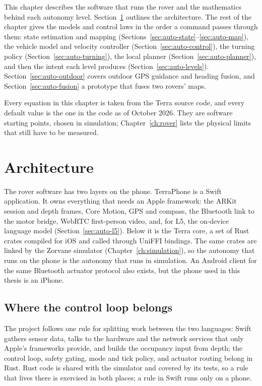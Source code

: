 This chapter describes the software that runs the rover and the mathematics behind each autonomy level.
Section~\ref{sec:arch} outlines the architecture.
The rest of the chapter gives the models and control laws in the order a command passes through them: state estimation and mapping (Sections~\ref{sec:auto-state}--\ref{sec:auto-map}), the vehicle model and velocity controller (Section~\ref{sec:auto-control}), the turning policy (Section~\ref{sec:auto-turning}), the local planner (Section~\ref{sec:auto-planner}), and then the intent each level produces (Section~\ref{sec:auto-levels}).
Section~\ref{sec:auto-outdoor} covers outdoor GPS guidance and heading fusion, and Section~\ref{sec:auto-fusion} a prototype that fuses two rovers' maps.

Every equation in this chapter is taken from the Terra source code, and every default value is the one in the code as of October 2026.
They are software starting points, chosen in simulation; Chapter~\ref{ch:rover} lists the physical limits that still have to be measured.

\section{Architecture}
\label{sec:arch}

The rover software has two layers on the phone.
TerraPhone is a Swift application.
It owns everything that needs an Apple framework: the ARKit session and depth frames, Core Motion, GPS and compass, the Bluetooth link to the motor bridge, WebRTC first-person video, and, for L5, the on-device language model (Section~\ref{sec:auto-l5}).
Below it is the Terra core, a set of Rust crates compiled for iOS and called through UniFFI bindings.
The same crates are linked by the Zorvane simulator (Chapter~\ref{ch:simulation}), so the autonomy that runs on the phone is the autonomy that runs in simulation.
An Android client for the same Bluetooth actuator protocol also exists, but the phone used in this thesis is an iPhone.

\subsection{Where the control loop belongs}
\label{sec:arch-boundary}

The project follows one rule for splitting work between the two languages: Swift gathers sensor data, talks to the hardware and the network services that only Apple's frameworks provide, and builds the occupancy input from depth; the control loop, safety gating, mode and tick policy, and actuator routing belong in Rust.
Rust code is shared with the simulator and covered by its tests, so a rule that lives there is exercised in both places; a rule in Swift runs only on a phone.

